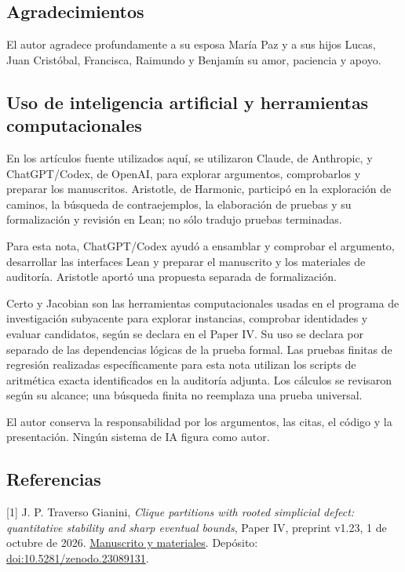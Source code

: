 \documentclass[spanish,11pt,a4paper]{article}
\begin{document}
\subsection{Agradecimientos}\label{agradecimientos}

El autor agradece profundamente a su esposa María Paz y a sus hijos
Lucas, Juan Cristóbal, Francisca, Raimundo y Benjamín su amor, paciencia
y apoyo.

\subsection{Uso de inteligencia artificial y herramientas
computacionales}\label{uso-de-inteligencia-artificial-y-herramientas-computacionales}

En los artículos fuente utilizados aquí, se utilizaron Claude, de
Anthropic, y ChatGPT/Codex, de OpenAI, para explorar argumentos,
comprobarlos y preparar los manuscritos. Aristotle, de Harmonic,
participó en la exploración de caminos, la búsqueda de contraejemplos,
la elaboración de pruebas y su formalización y revisión en Lean; no sólo
tradujo pruebas terminadas.

Para esta nota, ChatGPT/Codex ayudó a ensamblar y comprobar el
argumento, desarrollar las interfaces Lean y preparar el manuscrito y
los materiales de auditoría. Aristotle aportó una propuesta separada de
formalización.

\enlargethispage{2\baselineskip}Certo y Jacobian son las herramientas computacionales usadas en el
programa de investigación subyacente para explorar instancias, comprobar
identidades y evaluar candidatos, según se declara en el Paper IV. Su
uso se declara por separado de las dependencias lógicas de la prueba
formal. Las pruebas finitas de regresión realizadas específicamente para
esta nota utilizan los scripts de aritmética exacta identificados en la
auditoría adjunta. Los cálculos se revisaron según su alcance; una
búsqueda finita no reemplaza una prueba universal.

El autor conserva la responsabilidad por los argumentos, las citas, el
código y la presentación. Ningún sistema de IA figura como autor.

\subsection{Referencias}\small\label{referencias}

{[}1{]} J. P. Traverso Gianini, \emph{Clique partitions with rooted
simplicial defect: quantitative stability and sharp eventual bounds},
Paper IV, preprint v1.23, 1 de octubre de 2026.
\href{https://github.com/jtraverso/erdos-81-chordal-clique-partitions/blob/054593443bdece587dda9686a411bb18b0ca34c5/preprints/PAPER_IV/01_manuscript/PAPER_IV_preprint_v1.23_en.md}{Manuscrito
y materiales}. Depósito:
\href{https://doi.org/10.5281/zenodo.23089131}{doi:10.5281/zenodo.23089131}.
\end{document}
